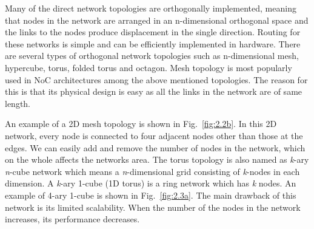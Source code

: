 Many of the direct network topologies are orthogonally implemented, meaning that nodes in the network are arranged in an n-dimensional orthogonal space and the links to the nodes produce displacement in the single direction. Routing for these networks is simple and can be efficiently implemented in hardware. There are several types of orthogonal network topologies such as n-dimensional mesh, hypercube, torus, folded torus and octagon. Mesh topology is most popularly used in NoC architectures among the above mentioned topologies. The reason for this is that its physical design is easy as all the links in the network are of same length. 

An example of a 2D mesh topology is shown in Fig.~\ref{fig:2.2b}. In this 2D network, every node is connected to four adjacent nodes other than those at the edges. We can easily add and remove the number of nodes in the network, which on the whole affects the networks area. The torus topology is also named as \textit{k}-ary \textit{n}-cube network which means a \textit{n}-dimensional grid consisting of \textit{k}-nodes in each dimension. A \textit{k}-ary 1-cube (1D torus) is a ring network which has \textit{k} nodes. An example of 4-ary 1-cube is shown in Fig.~\ref{fig:2.3a}. The main drawback of this network is its limited scalability. When the number of the nodes in the network increases, its performance decreases.  


